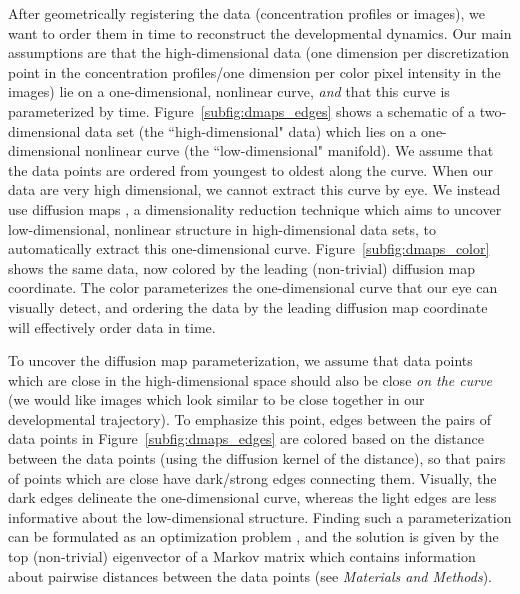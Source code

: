 \documentclass{pnastwo}
\begin{document}
\begin{article}
After geometrically registering the data (concentration profiles or images), we want to order them in time to reconstruct the developmental dynamics.
%
%
Our main assumptions are that the high-dimensional data (one dimension per discretization point in the concentration profiles/one dimension per color pixel intensity in the images) lie on a one-dimensional, nonlinear curve, {\em and} that this curve is parameterized by time.
%
Figure~\ref{subfig:dmaps_edges} shows a schematic of a two-dimensional data set (the ``high-dimensional" data) which lies on a one-dimensional nonlinear curve (the ``low-dimensional" manifold).
%
We assume that the data points are ordered from youngest to oldest along the curve.
%
When our data are very high dimensional, we cannot extract this curve by eye.
%
We instead use diffusion maps \cite{coifman2005geometric}, a dimensionality reduction technique which aims to uncover low-dimensional, nonlinear structure in high-dimensional data sets, to automatically extract this one-dimensional curve.
%
Figure~\ref{subfig:dmaps_color} shows the same data, now colored by the leading (non-trivial) diffusion map coordinate.
%
The color parameterizes the one-dimensional curve that our eye can visually detect, and ordering the data by the leading diffusion map coordinate will effectively order data in time.

To uncover the diffusion map parameterization, we assume that data points which are close in the high-dimensional space should also be close {\em on the curve} (we would like images which look similar to be close together in our developmental trajectory).
%
%
To emphasize this point, edges between the pairs of data points in Figure~\ref{subfig:dmaps_edges} are colored based on the distance between the data points (using the diffusion kernel of the distance), so that pairs of points which are close have dark/strong edges connecting them.
%
Visually, the dark edges delineate the one-dimensional curve, whereas the light edges are less informative about the low-dimensional structure.
%
%
Finding such a parameterization can be formulated as an optimization problem \cite{Belkin2003}, and the solution is given by the top (non-trivial) eigenvector of a Markov matrix which contains information about pairwise distances between the data points (see {\it Materials and Methods}).
%
%


\end{article}
\end{document}
